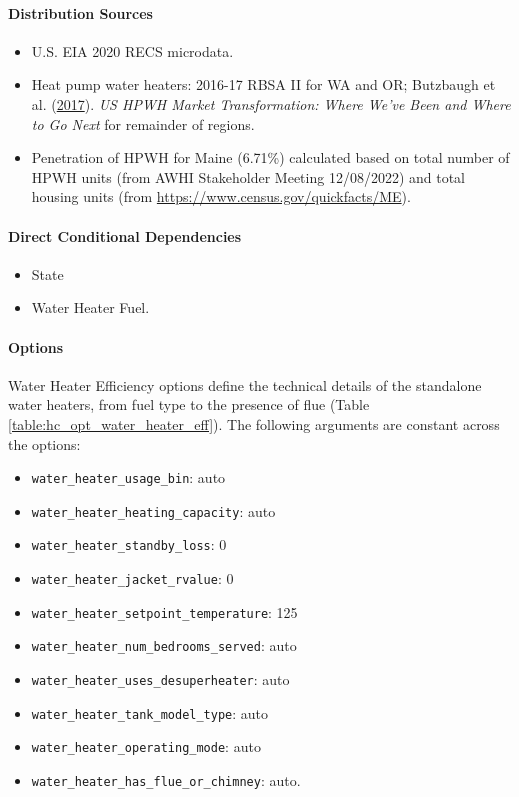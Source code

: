 \paragraph{Distribution Sources}
\begin{itemize}
\item
  U.S. EIA 2020 RECS microdata.
\item
  Heat pump water heaters: 2016-17 RBSA II for WA and OR; Butzbaugh
  et al. (\href{https://www.osti.gov/biblio/1433775}{2017}). \textit{US HPWH Market Transformation: Where
  We've Been and Where to Go Next} for remainder of
  regions.
\item
  Penetration of HPWH for Maine (6.71\%) calculated based on total
  number of HPWH units (from AWHI Stakeholder Meeting 12/08/2022) and total
  housing units (from \url{https://www.census.gov/quickfacts/ME}).
\end{itemize}

\paragraph{Direct Conditional Dependencies}
\begin{itemize}
\item State
\item Water Heater Fuel.
\end{itemize}

\paragraph{Options}
Water Heater Efficiency options define the technical details of the standalone water heaters, from fuel type to the presence of flue (Table \ref{table:hc_opt_water_heater_eff}).  The following arguments are constant across the options:

\begin{itemize}
    \item \texttt{water\_heater\_usage\_bin}: auto
    \item \texttt{water\_heater\_heating\_capacity}: auto
    \item \texttt{water\_heater\_standby\_loss}: 0
    \item \texttt{water\_heater\_jacket\_rvalue}: 0
    \item \texttt{water\_heater\_setpoint\_temperature}: 125
    \item \texttt{water\_heater\_num\_bedrooms\_served}: auto
    \item \texttt{water\_heater\_uses\_desuperheater}: auto
    \item \texttt{water\_heater\_tank\_model\_type}: auto
    \item \texttt{water\_heater\_operating\_mode}: auto
    \item \texttt{water\_heater\_has\_flue\_or\_chimney}: auto.
\end{itemize}


